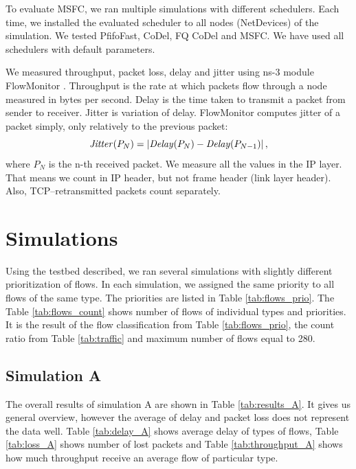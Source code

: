 To evaluate MSFC, we ran multiple simulations with different schedulers. Each time, we installed the evaluated scheduler to all nodes (NetDevices) of the simulation. We tested PfifoFast, CoDel, FQ CoDel and MSFC. We have used all schedulers with default parameters. 

We measured throughput, packet loss, delay and jitter using ns-3 module FlowMonitor \cite{flowMonitor}. Throughput is the rate at which packets flow through a node measured in bytes per second. Delay is the time taken to transmit a packet from sender to receiver. Jitter is variation of delay. FlowMonitor computes jitter of a packet simply, only relatively to the previous packet:
\[
	\text{\emph{Jitter}}(P_N) = \left|{\text{\emph{Delay}}(P_N) - \text{\emph{Delay}}(P_{N-1})}\right|,
\]
where $P_N$ is the n-th received packet. We measure all the values in the IP layer. That means we count in IP header, but not frame header (link layer header). Also, TCP--retransmitted packets count separately.


\section{Simulations}

 
%






Using the testbed described, we ran several simulations with slightly different prioritization of flows. In each simulation, we assigned the same priority to all flows of the same type. The priorities are listed in Table \ref{tab:flows_prio}. The Table \ref{tab:flows_count} shows number of flows of individual types and priorities. It is the result of the flow classification from Table \ref{tab:flows_prio}, the count ratio from Table \ref{tab:traffic} and maximum number of flows equal to 280.  

\subsection{Simulation A}

The overall results of simulation A are shown in Table \ref{tab:results_A}. It gives us general overview, however the average of delay and packet loss does not represent the data well. Table \ref{tab:delay_A} shows average delay of types of flows, Table \ref{tab:loss_A} shows number of lost packets and Table \ref{tab:throughput_A} shows how much throughput receive an average flow of particular type.

